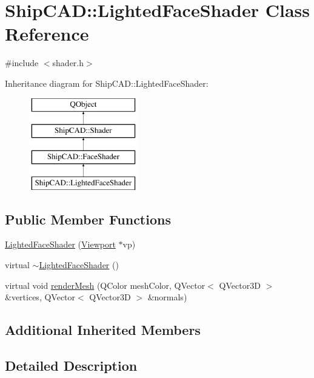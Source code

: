 \hypertarget{classShipCAD_1_1LightedFaceShader}{\section{Ship\-C\-A\-D\-:\-:Lighted\-Face\-Shader Class Reference}
\label{classShipCAD_1_1LightedFaceShader}
}


{\ttfamily \#include $<$shader.\-h$>$}

Inheritance diagram for Ship\-C\-A\-D\-:\-:Lighted\-Face\-Shader\-:\begin{figure}[H]
\begin{center}
\leavevmode
\includegraphics[height=4.000000cm]{classShipCAD_1_1LightedFaceShader}
\end{center}
\end{figure}
\subsection*{Public Member Functions}
\begin{DoxyCompactItemize}
\item 
\hyperlink{classShipCAD_1_1LightedFaceShader_a2af0e951890116c518c54c8afe978a3a}{Lighted\-Face\-Shader} (\hyperlink{classShipCAD_1_1Viewport}{Viewport} $\ast$vp)
\item 
virtual \hyperlink{classShipCAD_1_1LightedFaceShader_a6ce7e752639fd1c8dd12b721279ac814}{$\sim$\-Lighted\-Face\-Shader} ()
\item 
virtual void \hyperlink{classShipCAD_1_1LightedFaceShader_abd4fe9c01a7e09aa46f3017f014018a8}{render\-Mesh} (Q\-Color mesh\-Color, Q\-Vector$<$ Q\-Vector3\-D $>$ \&vertices, Q\-Vector$<$ Q\-Vector3\-D $>$ \&normals)
\end{DoxyCompactItemize}
\subsection*{Additional Inherited Members}


\subsection{Detailed Description}


